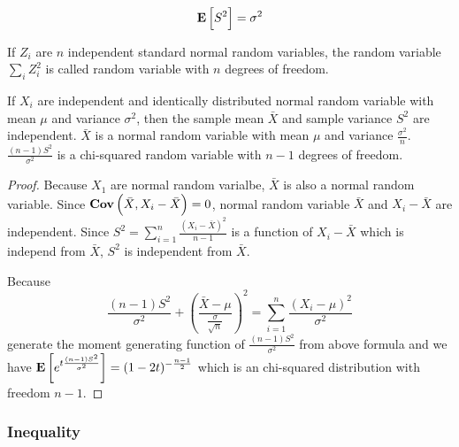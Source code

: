 \begin{theorem}
\begin{equation}
    \mathop{\bf E\/} \left[ S^2 \right] = \sigma^2
\end{equation}    
\end{theorem}


\begin{definition}
    If $Z_i$ are $n$ independent standard normal random variables, the random variable $\displaystyle \sum_i Z_i^2$ is called  random variable with $n$ degrees of freedom.
\end{definition}

\begin{theorem}
If $X_i$ are independent and identically distributed normal random variable with mean $\mu$     and variance $\sigma^2$, then the sample mean $\bar{X}$ and sample variance $S^2$ are independent. $\bar{X}$ is a normal random variable with mean $\mu$ and variance $\displaystyle \frac{\sigma^2}{n}$. $\displaystyle \frac{(n-1)S^2}{\sigma^2}$ is a chi-squared random variable with $n-1$ degrees of freedom.
\end{theorem}

\begin{proof}
    Because $X_1$ are normal random varialbe, $\bar{X}$ is also a normal random variable. Since $\mathop{\bf Cov\/}\left(\bar{X},X_i - \bar{X} \right) = 0$, normal random variable $\bar{X}$ and $X_i - \bar{X}$ are independent. Since $S^2 = \displaystyle \sum_{i=1}^n \frac{(X_i - \bar{X})^2}{n -1}$ is a function of $X_i - \bar{X}$ which is independ from $\bar{X}$, $S^2$ is independent from $\bar{X}$.
    
    Because 
    \begin{equation*}
        \frac{(n-1)S^2}{\sigma^2} + \left(\frac{\bar{X} - \mu}{\frac{\sigma}{\sqrt{n}}}\right)^2 = \sum_{i=1}^n \frac{(X_i - \mu)^2}{\sigma^2}
    \end{equation*}
    generate the moment generating function of $\frac{(n-1)S^2}{\sigma^2}$ from above formula and we have $\mathop{\bf E\/} \left[ e^{t \frac{(n-1)S^2}{\sigma^2}} \right] =\displaystyle (1-2t)^{- \frac{n-1}{2}}$ which is an chi-squared distribution with freedom $n-1$.
\end{proof}



\subsubsection{Inequality}

